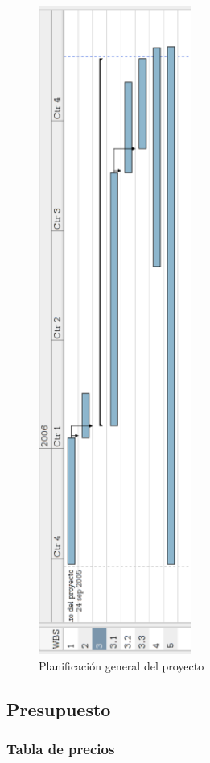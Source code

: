 \begin{figure}[p]
 	\centering
	\includegraphics[width=5cm]{images/gantt.png}
	\caption{Planificación general del proyecto}
	\label{fig:gantt}
\end{figure}


\subsection{Presupuesto}

\subsubsection{Tabla de precios}

